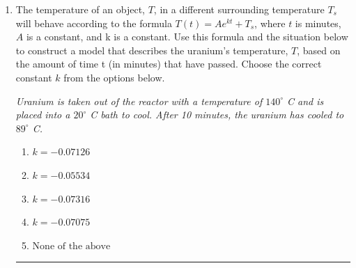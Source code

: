 \documentclass[14pt]{extbook}
\newcommand{\litem}[1]{\item#1\hspace*{-1cm}\rule{\textwidth}{0.4pt}}
\begin{document}
\begin{enumerate}
{\begin{enumerate}[label=\Alph*.]
\end{enumerate} }
\litem{
The temperature of an object, $T$, in a different surrounding temperature $T_s$ will behave according to the formula $T(t) = Ae^{kt} + T_s$, where $t$ is minutes, $A$ is a constant, and k is a constant. Use this formula and the situation below to construct a model that describes the uranium's temperature, $T$, based on the amount of time t (in minutes) that have passed. Choose the correct constant $k$ from the options below.
\begin{center}
    \textit{ Uranium is taken out of the reactor with a temperature of $140^{\circ}$ C and is placed into a $20^{\circ}$ C bath to cool. After 10 minutes, the uranium has cooled to $89^{\circ}$ C. }
\end{center}
\begin{enumerate}[label=\Alph*.]
\item \( k = -0.07126 \)
\item \( k = -0.05534 \)
\item \( k = -0.07316 \)
\item \( k = -0.07075 \)
\item \( \text{None of the above} \)

\end{enumerate} }
\end{enumerate}
\end{document}
